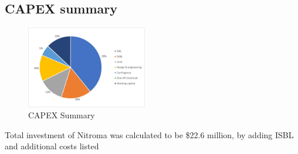 \subsection{CAPEX summary}
\begin{figure}
    \vspace{-1.1cm}
    \caption{CAPEX Summary}
    \label{fig:OPEXSummary}
    \includegraphics[width=0.47\textwidth]{chapters/6-economics/figures/CAPEX_summary.jpg}
\end{figure}
Total investment of Nitroma was calculated to be \$22.6 million, by adding ISBL and additional costs listed 
